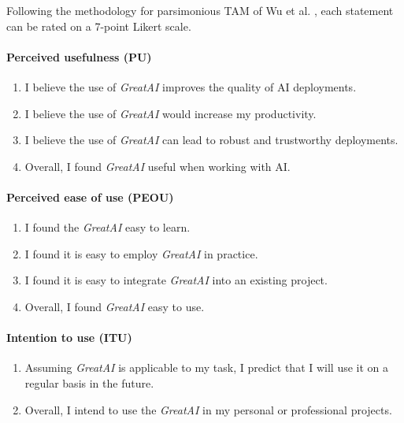 Following the methodology for parsimonious TAM of Wu et al. \cite{wu2011user}, each statement can be rated on a 7-point Likert scale.

\paragraph{Perceived usefulness (PU)}
\begin{enumerate}
 \item I believe the use of \textit{GreatAI} improves the quality of AI deployments.
 \item I believe the use of \textit{GreatAI} would increase my productivity.
 \item I believe the use of \textit{GreatAI} can lead to robust and trustworthy deployments.
 \item Overall, I found \textit{GreatAI} useful when working with AI.
\end{enumerate}

\paragraph{Perceived ease of use (PEOU)}
\begin{enumerate}
 \item I found the  \textit{GreatAI} easy to learn.
 \item I found it is easy to employ \textit{GreatAI} in practice.
 \item I found it is easy to integrate \textit{GreatAI} into an existing project.
 \item Overall, I found \textit{GreatAI} easy to use.
\end{enumerate}

\paragraph{Intention to use (ITU)}
\begin{enumerate}
 \item Assuming \textit{GreatAI} is applicable to my task, I predict that I will use it on a regular basis in the future.
 \item Overall, I intend to use the \textit{GreatAI} in my personal or professional projects.
\end{enumerate}

